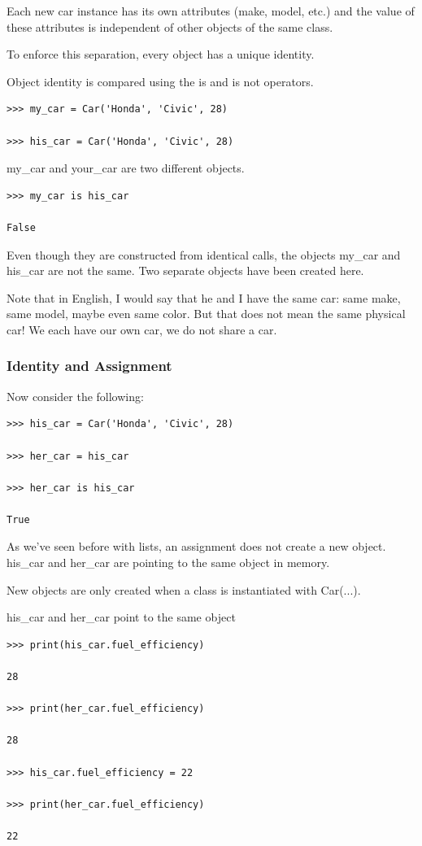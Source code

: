 \documentclass{article}
\begin{document}
Each new car instance has its own attributes (make, model, etc.) and the value of these attributes is independent of other objects of the same class.

To enforce this separation, every object has a unique identity.

Object identity is compared using the is and is not operators.

\begin{lstlisting}
>>> my_car = Car('Honda', 'Civic', 28)

>>> his_car = Car('Honda', 'Civic', 28)
\end{lstlisting}

my{\_}car and your{\_}car are two different objects.

\begin{lstlisting}
>>> my_car is his_car

False
\end{lstlisting}

Even though they are constructed from identical calls, the objects my{\_}car and his{\_}car are not the same. Two separate objects have been created here.

Note that in English, I would say that he and I have the same car:  same make, same model, maybe even same color.   But that does not mean the same physical car!  We each have our own car, we do not share a car.

\subsubsection{Identity and Assignment}

Now consider the following:

\begin{lstlisting}
>>> his_car = Car('Honda', 'Civic', 28)

>>> her_car = his_car

>>> her_car is his_car

True
\end{lstlisting}

As we’ve seen before with lists, an assignment does not create a new object.  his{\_}car and her{\_}car are pointing to the same object in memory.

New objects are only created when a class is instantiated with Car(...).

his{\_}car and her{\_}car point to the same object

\begin{lstlisting}
>>> print(his_car.fuel_efficiency)

28

>>> print(her_car.fuel_efficiency)

28

>>> his_car.fuel_efficiency = 22

>>> print(her_car.fuel_efficiency)

22 
\end{lstlisting}
\end{document}
